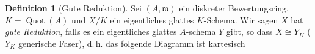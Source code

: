 \documentclass[english, german, parskip=half]{scrreprt}
\theoremstyle{definition}
\newtheorem{Definition}[Satz]{Definition}
\theoremstyle{remark}
\newcommand*{\K}{\ensuremath{K}} %
\DeclareMathOperator{\Quot}{Quot} %
\DeclareMathOperator{\Spec}{Spec} %
\renewcommand*{\m}{\mathfrak{m}} %
\renewcommand*{\k}{\kappa} %
\newcommand*{\n}{\eta} %
\begin{document}
\begin{Definition}[Gute Reduktion]
Sei $(A,\m)$ ein diskreter Bewertungsring, $\K=\Quot(A)$ und $X/\K$
ein eigentliches glattes $\K$-Schema.
Wir sagen $X$ hat \emph{gute Reduktion}, falls es ein eigentliches
glattes $A$-schema $Y$ gibt, so dass $X\cong Y_{\K}$ ($Y_{\K}$
generische Faser), d.\,h. das folgende Diagramm ist kartesisch
\begin{center}
\end{center}
\cite[siehe][Definition 3.1]{goodreduction}
\end{Definition}



\nocite{*}
\printbibliography
\end{document}
